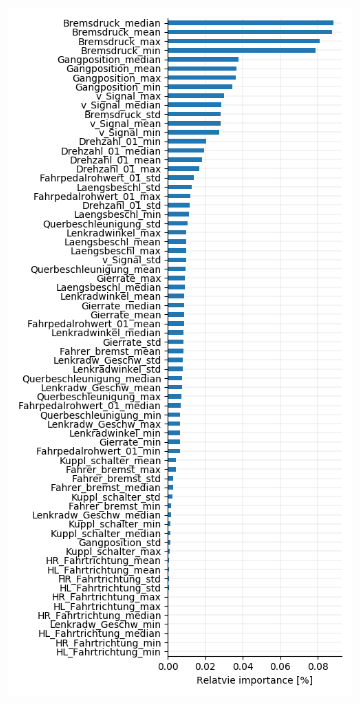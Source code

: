 \begin{figure}
  \centering
  \begin{subfigure}[c]{0.45\textwidth}
    \centering
    \includegraphics[width=\textwidth]{images/feature_importance.png}

\end{subfigure}
\end{figure}
